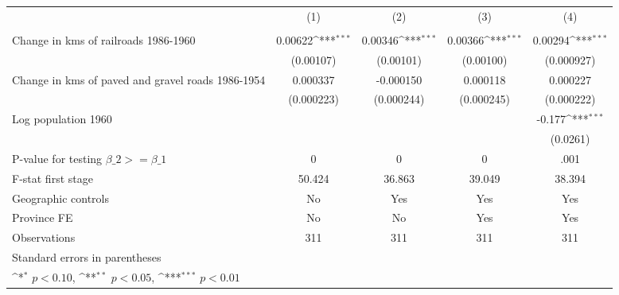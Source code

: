 {
\def\sym#1{\ifmmode^{#1}\else\(^{#1}\)\fi}
\begin{tabular}{l*{4}{c}}
\hline\hline
                &\multicolumn{1}{c}{(1)}&\multicolumn{1}{c}{(2)}&\multicolumn{1}{c}{(3)}&\multicolumn{1}{c}{(4)}\\
                &\multicolumn{1}{c}{}&\multicolumn{1}{c}{}&\multicolumn{1}{c}{}&\multicolumn{1}{c}{}\\
\hline
Change in kms of railroads 1986-1960&  0.00622\sym{***}&  0.00346\sym{***}&  0.00366\sym{***}&  0.00294\sym{***}\\
                &(0.00107)         &(0.00101)         &(0.00100)         &(0.000927)         \\
[1em]
Change in kms of paved and gravel roads 1986-1954& 0.000337         &-0.000150         & 0.000118         & 0.000227         \\
                &(0.000223)         &(0.000244)         &(0.000245)         &(0.000222)         \\
[1em]
Log population 1960&                  &                  &                  &   -0.177\sym{***}\\
                &                  &                  &                  & (0.0261)         \\
\hline
P-value for testing $\beta\_{2} >= \beta\_{1}$&        0         &        0         &        0         &     .001         \\
F-stat first stage&   50.424         &   36.863         &   39.049         &   38.394         \\
Geographic controls&       No         &      Yes         &      Yes         &      Yes         \\
Province FE     &       No         &       No         &      Yes         &      Yes         \\
Observations    &      311         &      311         &      311         &      311         \\
\hline\hline
\multicolumn{5}{l}{\footnotesize Standard errors in parentheses}\\
\multicolumn{5}{l}{\footnotesize \sym{*} \(p<0.10\), \sym{**} \(p<0.05\), \sym{***} \(p<0.01\)}\\
\end{tabular}
}
